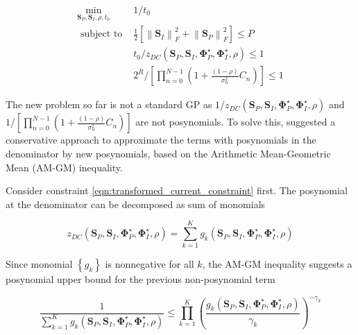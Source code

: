 \begin{eqnarray}
  {\mathop {\min }\limits_{{{\mathbf{S}}_P},{{\mathbf{S}}_I},\rho ,{t_0}} }&{1/{t_0}} \label{eqn:transformed_target} \\
  {{\text{ subject to }}}&{\frac{1}{2}\left[ {\left\| {{{\mathbf{S}}_I}} \right\|_F^2 + \left\| {{{\mathbf{S}}_P}} \right\|_F^2} \right] \leqslant P} \label{eqn:transformed_power_constraint} \\
  {}&{{t_0}/{z_{DC}}\left( {{{\mathbf{S}}_P},{{\mathbf{S}}_I},{\mathbf{\Phi }}_P^ \star ,{\mathbf{\Phi }}_I^ \star ,\rho } \right) \leqslant 1} \label{eqn:transformed_current_constraint} \\
  {}&{{2^{\bar R}}/\left[ {\prod\limits_{n = 0}^{N - 1} {\left( {1 + \frac{{(1 - \rho )}}{{\sigma _n^2}}{C_n}} \right)} } \right] \leqslant 1} \label{eqn:transformed_rate_constraint}
\end{eqnarray}

The new problem so far is not a standard GP as $1/{z_{DC}}\left( {{{\mathbf{S}}_P},{{\mathbf{S}}_I},{\mathbf{\Phi }}_P^ \star ,{\mathbf{\Phi }}_I^ \star ,\rho } \right)$ and $1/\left[ {\prod\nolimits_{n = 0}^{N - 1} {\left( {1 + \frac{{(1 - \rho )}}{{\sigma _n^2}}{C_n}} \right)} } \right]$ are not posynomials. To solve this, \cite{Clerckx2018} suggested a conservative approach to approximate the terms with posynomials in the denominator by new posynomials, based on the Arithmetic Mean-Geometric Mean (AM-GM) inequality.

Consider constraint \ref{eqn:transformed_current_constraint} first. The posynomial at the denominator can be decomposed as sum of monomials

\begin{equation}\label{eqn:transformed_current_posynomial_decomposition}
  {z_{DC}}\left( {{{\mathbf{S}}_P},{{\mathbf{S}}_I},{\mathbf{\Phi }}_P^ \star ,{\mathbf{\Phi }}_I^ \star ,\rho } \right) = \sum\limits_{k = 1}^K {{g_k}\left( {{{\mathbf{S}}_P},{{\mathbf{S}}_I},{\mathbf{\Phi }}_P^ \star ,{\mathbf{\Phi }}_I^ \star ,\rho } \right)}
\end{equation}

Since monomial $\left\{ {{g_k}} \right\}$ is nonnegative for all $k$, the AM-GM inequality suggests a posynomial upper bound for the previous non-posynomial term

\begin{equation}\label{eqn:transformed_current_am_gm}
  \frac{1}{{\sum\limits_{k = 1}^K {{g_k}\left( {{{\mathbf{S}}_P},{{\mathbf{S}}_I},{\mathbf{\Phi }}_P^ \star ,{\mathbf{\Phi }}_I^ \star ,\rho } \right)} }} \leqslant \prod\limits_{k = 1}^K {{{\left( {\frac{{{g_k}\left( {{{\mathbf{S}}_P},{{\mathbf{S}}_I},{\mathbf{\Phi }}_P^ \star ,{\mathbf{\Phi }}_I^ \star ,\rho } \right)}}{{{\gamma _k}}}} \right)}^{ - {\gamma _k}}}}
\end{equation}

